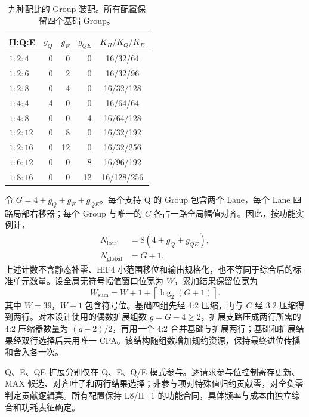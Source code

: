 \begin{table}[t]
\centering
\caption{九种配比的 Group 装配。所有配置保留四个基础 Group。}
\label{tab:ratio9_composition}
\footnotesize
\begin{tabular}{@{}lrrrc@{}}\toprule
H:Q:E & $g_Q$ & $g_E$ & $g_{QE}$ & $K_H/K_Q/K_E$ \\\midrule
$1:2:4$ & 0 & 0 & 0 & 16/32/64 \\
$1:2:6$ & 0 & 2 & 0 & 16/32/96 \\
$1:2:8$ & 0 & 4 & 0 & 16/32/128 \\
$1:4:4$ & 4 & 0 & 0 & 16/64/64 \\
$1:4:8$ & 0 & 0 & 4 & 16/64/128 \\
$1:2:12$ & 0 & 8 & 0 & 16/32/192 \\
$1:2:16$ & 0 & 12 & 0 & 16/32/256 \\
$1:6:12$ & 0 & 0 & 8 & 16/96/192 \\
$1:8:16$ & 0 & 0 & 12 & 16/128/256 \\
\bottomrule\end{tabular}
\end{table}

令 $G=4+g_Q+g_E+g_{QE}$。每个支持 Q 的 Group 包含两个 Lane，每个 Lane 四路局部右移器；每个 Group 与唯一的 $C$ 各占一路全局幅值对齐。因此，按功能实例计，
\begin{equation}
\begin{aligned}
N_{\mathrm{local}}&=8(4+g_Q+g_{QE}),\\
N_{\mathrm{global}}&=G+1.
\end{aligned}
\label{eq:shifter_count}
\end{equation}
上述计数不含静态补零、HiF4 小范围移位和输出规格化，也不等同于综合后的标准单元数量。设全局无符号幅值窗口位宽为 $W$，累加结果保留位宽为
\begin{equation}
W_{\mathrm{sum}}=W+1+\left\lceil\log_2(G+1)\right\rceil.
\label{eq:expanded_sum_width}
\end{equation}
其中 $W=39$，$W+1$ 包含符号位。基础四组先经 4:2 压缩，再与 $C$ 经 3:2 压缩得到两行。对本设计使用的偶数扩展组数 $g=G-4\ge2$，扩展支路压成两行所需的 4:2 压缩器数量为 $(g-2)/2$，再用一个 4:2 合并基础与扩展两行；基础和扩展结果经双行选择后共用唯一 CPA。该结构随组数增加规约资源，保持最终进位传播和舍入各一次。

Q、E、QE 扩展分别仅在 Q、E、Q/E 模式参与。逐请求参与位控制寄存更新、MAX 候选、对齐叶子和两行结果选择；非参与项对特殊值归约贡献零，对全负零判定贡献逻辑真。所有配置保持 L8/II=1 的功能合同，具体频率与成本由独立综合和功耗表征确定。
